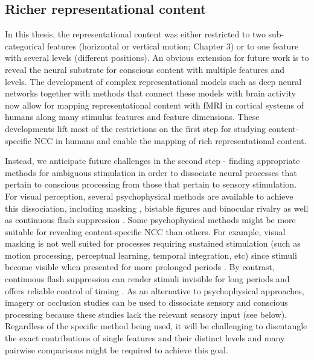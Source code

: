 \subsection{Richer representational content}
In this thesis, the representational content was either restricted to two sub-categorical features (horizontal or vertical motion; Chapter 3) or to one feature with several levels (different positions). An obvious extension for future work is to reveal the neural substrate for conscious content with multiple features and levels. The development of complex representational models such as deep neural networks \parencite{Kriegeskorte2014, Kriegeskorte2015, Yamins2016, Bashivan2019} together with methods that connect these models with brain activity \parencite{Kriegeskorte2008, Naselaris2011, Diedrichsen2017, Diedrichsen2018} now allow for mapping representational content with fMRI in cortical systems of humans along many stimulus features and feature dimensions. These developments lift most of the restrictions on the first step for studying content-specific NCC in humans and enable the mapping of rich representational content.  

Instead, we anticipate future challenges in the second step - finding appropriate methods for ambiguous stimulation in order to dissociate neural processes that pertain to conscious processing from those that pertain to sensory stimulation. For visual perception, several psychophysical methods are available to achieve this dissociation, including masking \parencite{Kouider2007, Breitmeyer2010}, bistable figures and binocular rivalry \parencite{Kim2005} as well as continuous flash suppression \parencite{Tsuchiya2005}. Some psychophysical methods might be more suitable for revealing content-specific NCC than others. For example, visual masking is not well suited for processes requiring sustained stimulation (such as motion processing, perceptual learning, temporal integration, etc) since stimuli become visible when presented for more prolonged periods \parencite{Faivre2014}. By contrast, continuous flash suppression can render stimuli invisible for long periods and offers reliable control of timing \parencite{Tsuchiya2005, Faivre2014}. As an alternative to psychophysical approaches, imagery or occlusion \parencite{Muckli2015} studies can be used to dissociate sensory and conscious processing because these studies lack the relevant sensory input (see below). Regardless of the specific method being used, it will be challenging to disentangle the exact contributions of single features and their distinct levels and many pairwise comparisons might be required to achieve this goal.

